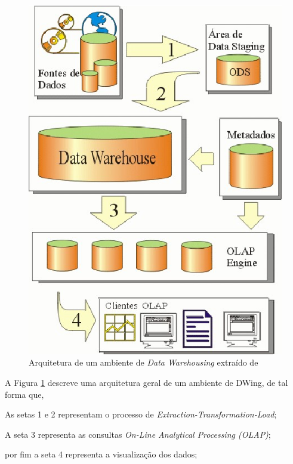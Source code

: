 \begin{figure}[h!]
\centering
	\includegraphics[keepaspectratio=true,scale=1.1]{figuras/Dwing.eps}
	\caption{Arquitetura de um ambiente de \textit{Data Warehousing} extraído de 
	}
	\label{dwing}
\end{figure}
\FloatBarrier



A Figura \ref{dwing} descreve uma arquitetura geral de um ambiente de DWing, de tal forma que,

\begin{inparaenum}[i)]
	\item As setas 1 e 2 representam o processo de \textit{Extraction-Transformation-Load};
	
	\item A seta 3 representa as consultas \textit{On-Line Analytical Processing (OLAP)};
	
	\item por fim a seta 4 representa a visualização dos dados;

\end{inparaenum}
 
